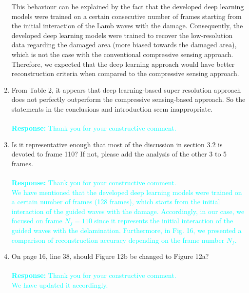 \documentclass[11pt,a2paper]{report}
\begin{document}
\begin{enumerate}
{			This behaviour can be explained by the fact that the developed deep learning models were trained on a certain consecutive number of frames starting from the initial interaction of the Lamb waves with the damage. 
			Consequently, the developed deep learning models were trained to recover the low-resolution data regarding the damaged area (more biased towards the damaged area), which is not the case with the conventional compressive sensing approach.
			Therefore, we expected that the deep learning approach would have better reconstruction criteria when compared to the compressive sensing approach.	
		}
		\item From Table 2, it appears that deep learning-based super resolution approach does not perfectly outperform the compressive sensing-based approach. 
		So the statements in the conclusions and introduction seem inappropriate.
		\\ \\ 
		\textcolor{Cyan}
		{
			\textbf{Response:}
			Thank you for your constructive comment. \\
		}
		\item Is it representative enough that most of the discussion in section 3.2 is devoted to frame 110? If not, please add the analysis of the other 3 to 5 frames.
		\\ \\ 
		\textcolor{Cyan}
		{
			\textbf{Response:}
			Thank you for your constructive comment. \\
			We have mentioned that the developed deep learning models were trained on a certain number of frames (128 frames), which starts from the initial interaction of the guided waves with the damage.
			Accordingly, in our case, we focused on frame $N_f =110$ since it represents the initial interaction of the guided waves with the delamination.
			Furthermore, in Fig. 16, we presented a comparison of reconstruction accuracy depending on the frame number $N_f$.
		}
		\item On page 16, line 38, should Figure 12b be changed to Figure 12a?
		\\ \\ 
		\textcolor{Cyan}
		{
			\textbf{Response:}
			Thank you for your constructive comment. 
			\\
			We have updated it accordingly.
		}
	\end{enumerate}
\end{document}
